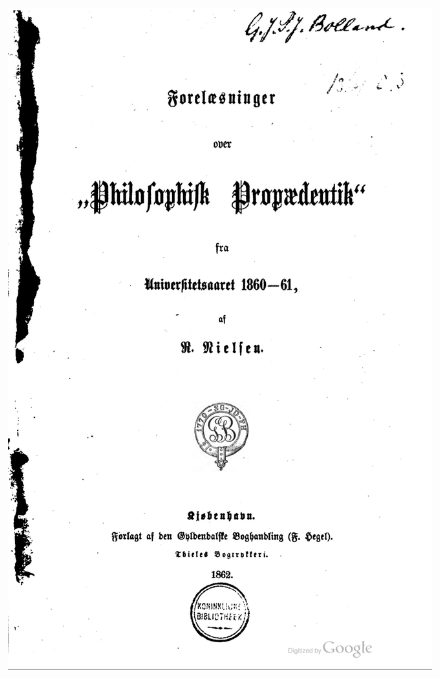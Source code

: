\documentclass[ignorenonframetext, ]{beamer}
\begin{document}
\begin{frame}

\begin{figure}
  \centering \includegraphics[scale=0.5]{prop1.png}
\end{figure}
\end{frame}
\end{document}
